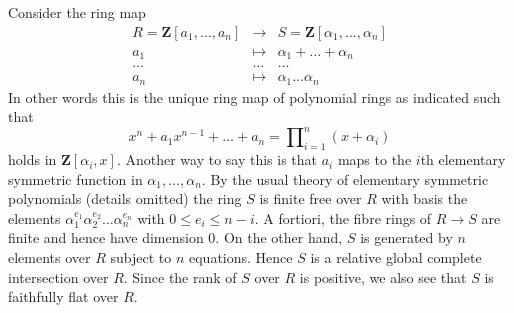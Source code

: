 \begin{example}
\label{example-roots-universal-polynomial}
Consider the ring map
\begin{eqnarray*}
R = \mathbf{Z}[a_1, \ldots, a_n]
& \longrightarrow &
S = \mathbf{Z}[\alpha_1, \ldots, \alpha_n] \\
a_1 & \longmapsto &
\alpha_1 + \ldots + \alpha_n \\
\ldots & \ldots & \ldots \\
a_n & \longmapsto & \alpha_1 \ldots \alpha_n
\end{eqnarray*}
In other words this is the unique ring map of polynomial
rings as indicated such that
$$
x^n + a_1 x^{n - 1} + \ldots + a_n
=
\prod\nolimits_{i = 1}^n (x + \alpha_i)
$$
holds in $\mathbf{Z}[\alpha_i, x]$. Another way to say this
is that $a_i$ maps to the $i$th elementary symmetric function
in $\alpha_1, \ldots, \alpha_n$. By the usual theory of elementary
symmetric polynomials (details omitted) the ring $S$ is finite
free over $R$ with basis the elements
$\alpha_1^{e_1} \alpha_2^{e_2} \ldots \alpha_n^{e_n}$ with
$0 \leq e_i \leq n - i$. A fortiori, the fibre rings of
$R \to S$ are finite and hence have dimension $0$.
On the other hand, $S$ is generated by
$n$ elements over $R$ subject to $n$ equations. Hence $S$
is a relative global complete intersection over $R$.
Since the rank of $S$ over $R$ is positive, we also see
that $S$ is faithfully flat over $R$.
\end{example}